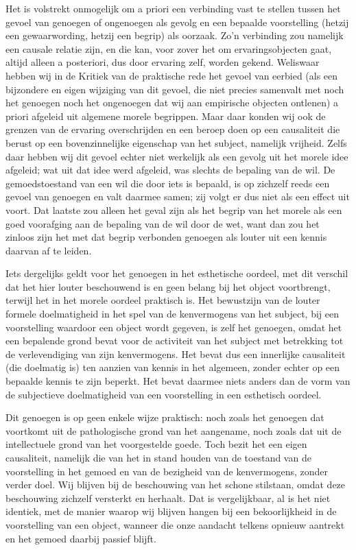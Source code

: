 Het is volstrekt onmogelijk om a priori een verbinding vast te stellen tussen het gevoel van genoegen of ongenoegen als gevolg en een bepaalde voorstelling (hetzij een gewaarwording, hetzij een begrip) als oorzaak. Zo’n verbinding zou namelijk een causale relatie zijn, en die kan, voor zover het om ervaringsobjecten gaat, altijd alleen a posteriori, dus door ervaring zelf, worden gekend.
Weliswaar hebben wij in de Kritiek van de praktische rede het gevoel van eerbied (als een bijzondere en eigen wijziging van dit gevoel, die niet precies samenvalt met noch het genoegen noch het ongenoegen dat wij aan empirische objecten ontlenen) a priori afgeleid uit algemene morele begrippen. Maar daar konden wij ook de grenzen van de ervaring overschrijden en een beroep doen op een causaliteit die berust op een bovenzinnelijke eigenschap van het subject, namelijk vrijheid. Zelfs daar hebben wij dit gevoel echter niet werkelijk als een gevolg uit het morele idee afgeleid; wat uit dat idee werd afgeleid, was slechts de bepaling van de wil. De gemoedstoestand van een wil die door iets is bepaald, is op zichzelf reeds een gevoel van genoegen en valt daarmee samen; zij volgt er dus niet als een effect uit voort. Dat laatste zou alleen het geval zijn als het begrip van het morele als een goed voorafging aan de bepaling van de wil door de wet, want dan zou het zinloos zijn het met dat begrip verbonden genoegen als louter uit een kennis daarvan af te leiden.

Iets dergelijks geldt voor het genoegen in het esthetische oordeel, met dit verschil dat het hier louter beschouwend is en geen belang bij het object voortbrengt, terwijl het in het morele oordeel praktisch is. Het bewustzijn van de louter formele doelmatigheid in het spel van de kenvermogens van het subject, bij een voorstelling waardoor een object wordt gegeven, is zelf het genoegen, omdat het een bepalende grond bevat voor de activiteit van het subject met betrekking tot de verlevendiging van zijn kenvermogens. Het bevat dus een innerlijke causaliteit (die doelmatig is) ten aanzien van kennis in het algemeen, zonder echter op een bepaalde kennis te zijn beperkt. Het bevat daarmee niets anders dan de vorm van de subjectieve doelmatigheid van een voorstelling in een esthetisch oordeel.

Dit genoegen is op geen enkele wijze praktisch: noch zoals het genoegen dat voortkomt uit de pathologische grond van het aangename, noch zoals dat uit de intellectuele grond van het voorgestelde goede. Toch bezit het een eigen causaliteit, namelijk die van het in stand houden van de toestand van de voorstelling in het gemoed en van de bezigheid van de kenvermogens, zonder verder doel. Wij blijven bij de beschouwing van het schone stilstaan, omdat deze beschouwing zichzelf versterkt en herhaalt. Dat is vergelijkbaar, al is het niet identiek, met de manier waarop wij blijven hangen bij een bekoorlijkheid in de voorstelling van een object, wanneer die onze aandacht telkens opnieuw aantrekt en het gemoed daarbij passief blijft.

